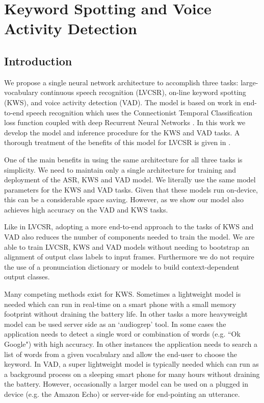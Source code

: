 \chapter{Keyword Spotting and Voice Activity Detection}

\section{Introduction}

We propose a single neural network architecture to accomplish three tasks:
large-vocabulary continuous speech recognition (LVCSR), on-line keyword
spotting (KWS), and voice activity detection (VAD). The model is based on work
in end-to-end speech recognition which uses the Connectionist Temporal
Classification loss function coupled with deep Recurrent Neural Networks
\cite{graves2014, hannun2014deepspeech}. In this work we develop the model and
inference procedure for the KWS and VAD tasks. A thorough treatment of the
benefits of this model for LVCSR is given in \cite{amodei2016deep}.

One of the main benefits in using the same architecture for all three tasks is
simplicity. We need to maintain only a single architecture for training and
deployment of the ASR, KWS and VAD model. We literally use the same model
parameters for the KWS and VAD tasks. Given that these models run on-device,
this can be a considerable space saving. However, as we show our model also
achieves high accuracy on the VAD and KWS tasks. 

Like in LVCSR, adopting a more end-to-end approach to the tasks of KWS and VAD
also reduces the number of components needed to train the model. We are able to
train LVCSR, KWS and VAD models without needing to bootstrap an alignment of
output class labels to input frames. Furthermore we do not require the use of a
pronunciation dictionary or models to build context-dependent output classes.

Many competing methods exist for KWS. Sometimes a lightweight model is needed
which can run in real-time on a smart phone with a small memory footprint
without draining the battery life. In other tasks a more heavyweight model can
be used server side as an `audiogrep' tool. In some cases the application needs
to detect a single word or combination of words (e.g. ``Ok Google") with high
accuracy. In other instances the application needs to search a list of words
from a given vocabulary and allow the end-user to choose the keyword. In VAD, a
super lightweight model is typically needed which can run as a background
process on a sleeping smart phone for many hours without draining the battery.
However, occasionally a larger model can be used on a plugged in device (e.g.
the Amazon Echo) or server-side for end-pointing an utterance.

